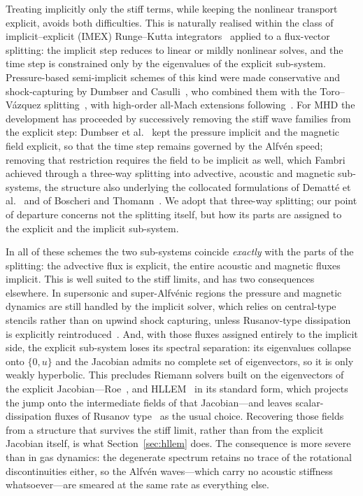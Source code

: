 \documentclass[a4paper,fleqn]{cas-sc}
\theoremstyle{remark}
\begin{document}
Treating implicitly only the stiff terms, while keeping the nonlinear transport
explicit, avoids both difficulties. This is naturally realised within the class of
implicit--explicit (IMEX) Runge--Kutta integrators~\cite{RKIMEX,RKIMEX2} applied to a
flux-vector splitting: the implicit step reduces to linear or mildly nonlinear solves, and the time
step is constrained only by the eigenvalues of the explicit sub-system. Pressure-based
semi-implicit schemes of this kind were made conservative and shock-capturing by
Dumbser and Casulli~\cite{DumbserCasulli2016}, who combined them with the
Toro--V\'azquez splitting~\cite{TVSplit}, with high-order all-Mach extensions
following~\cite{BoscheriPareschi2021,TavelliDumbser2017,FVVEM}. For MHD the
development has proceeded by successively removing the stiff wave families from the
explicit step: Dumbser et al.~\cite{Dumbser2019} kept the pressure implicit and the
magnetic field explicit, so that the time step remains governed by the Alfv\'en
speed; removing that restriction requires the field to be implicit as well, which
Fambri~\cite{Fambri2021} achieved through a three-way splitting into advective,
acoustic and magnetic sub-systems, the structure also underlying the collocated
formulations of Dematt\'e et al.~\cite{Dematte2024} and of Boscheri and
Thomann~\cite{BoscheriThomann2024}. We adopt that three-way splitting; our point of
departure concerns not the splitting itself, but how its parts are assigned to the
explicit and the implicit sub-system.

In all of these schemes the two sub-systems coincide \emph{exactly} with the parts of
the splitting: the advective flux is explicit, the entire acoustic and magnetic
fluxes implicit. This is well suited to the stiff limits, and has two consequences
elsewhere. In supersonic and super-Alfv\'enic regions the pressure and magnetic
dynamics are still handled by the implicit solver, which relies on central-type
stencils rather than on upwind shock capturing, unless Rusanov-type dissipation is
explicitly reintroduced~\cite{DumbserCasulli2016,BoscheriThomann2024,MHDIMEX}. And, with those fluxes assigned
entirely to the implicit side, the explicit sub-system loses its spectral separation:
its eigenvalues collapse onto $\{0,u\}$ and the Jacobian admits no complete set of
eigenvectors, so it is only weakly hyperbolic. This precludes Riemann solvers built on the
eigenvectors of the explicit Jacobian---Roe~\cite{Roe1981}, and
HLLEM~\cite{einfeldt1991godunov,HLLEM} in its standard form, which projects the
jump onto the intermediate fields of that Jacobian---and leaves
scalar-dissipation fluxes of Rusanov type~\cite{Rusanov1962} as the usual
choice. Recovering those fields from a structure that survives the stiff limit,
rather than from the explicit Jacobian itself, is what Section~\ref{sec:hllem}
does. The consequence is
more severe than in gas dynamics: the degenerate spectrum retains no trace of the
rotational discontinuities either, so the Alfv\'en waves---which carry no acoustic
stiffness whatsoever---are smeared at the same rate as everything else.
\end{document}
